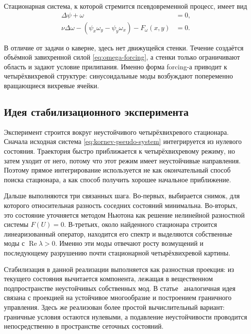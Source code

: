 \documentclass[12pt,a4paper]{article}
\newcommand{\Laplace}{\Delta}
\begin{document}
Стационарная система, к которой стремится псевдовременной процесс, имеет вид
\begin{equation}
\begin{aligned}
    \Laplace\psi+\omega&=0,\\
    \nu\Laplace\omega
    -
    \left(\psi_x\omega_y-\psi_y\omega_x\right)
    -
    F_\omega(x,y)&=0.
\end{aligned}
\label{eq:kornev-steady-system}
\end{equation}

В отличие от задачи о каверне, здесь нет движущейся стенки.
Течение создаётся объёмной завихренной силой \eqref{eq:omega-forcing}, а стенки только ограничивают область и задают условие прилипания.
Именно форма forcing-а приводит к четырёхвихревой структуре: синусоидальные моды возбуждают попеременно вращающиеся вихревые ячейки.

\subsection{Идея стабилизационного эксперимента}

Эксперимент строится вокруг неустойчивого четырёхвихревого стационара.
Сначала исходная система \eqref{eq:kornev-pseudo-system} интегрируется из нулевого состояния.
Траектория быстро приближается к четырёхвихревому режиму, но затем уходит от него, потому что этот режим имеет неустойчивые направления.
Поэтому прямое интегрирование используется не как окончательный способ поиска стационара, а как способ получить хорошее начальное приближение.

Дальше выполняются три связанных шага.
Во-первых, выбирается снимок, для которого относительная разность соседних состояний минимальна.
Во-вторых, это состояние уточняется методом Ньютона как решение нелинейной разностной системы \(F(U)=0\).
В-третьих, около найденного стационара строится линеаризованный оператор, находится его спектр и выделяются собственные моды с \(\operatorname{Re}\lambda>0\).
Именно эти моды отвечают росту возмущений и последующему разрушению почти стационарной четырёхвихревой картины.

Стабилизация в данной реализации выполняется как разностная проекция: из текущего состояния вычитается компонента, лежащая в вещественном подпространстве неустойчивых собственных мод.
В статье~\cite{kornev2018} аналогичная идея связана с проекцией на устойчивое многообразие и построением граничного управления.
Здесь же реализован более простой вычислительный вариант: граничные условия остаются нулевыми, а подавление неустойчивости проводится непосредственно в пространстве сеточных состояний.
\end{document}
